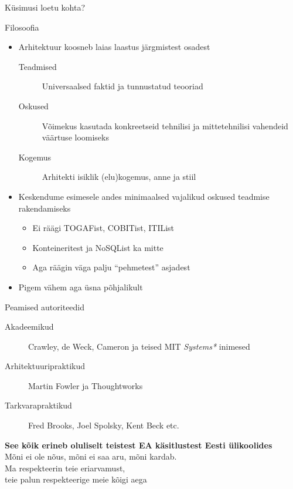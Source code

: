 \documentclass{beamer}
\begin{document}
\begin{frame}[standout]
Küsimusi loetu kohta?
\end{frame}


\begin{frame}{Filosoofia}
	\begin{itemize}
		\item Arhitektuur koosneb laias laastus järgmistest osadest
		\begin{description}
			\item[Teadmised] Universaalsed  faktid ja tunnustatud teooriad
			\item[Oskused] Võimekus kasutada konkreetseid tehnilisi ja mittetehnilisi vahendeid väärtuse loomiseks 
			\item[Kogemus] Arhitekti isiklik (elu)kogemus, anne ja stiil
		\end{description}
		\item Keskendume esimesele andes minimaalsed vajalikud oskused teadmise rakendamiseks
		\begin{itemize}
			\item Ei räägi TOGAFist, COBITist, ITIList
			\item Konteineritest ja NoSQList ka mitte
			\item Aga räägin väga palju \enquote{pehmetest} asjadest
		\end{itemize}
		\item Pigem vähem aga üsna põhjalikult
	\end{itemize}
\end{frame}

\begin{frame}{Peamised autoriteedid}
	\begin{description}
		\item[Akadeemikud] Crawley, de Weck, Cameron ja teised MIT \emph{Systems*} inimesed
		\item[Arhitektuuripraktikud] Martin Fowler ja Thoughtworks
		\item[Tarkvarapraktikud] Fred Brooks, Joel Spolsky, Kent Beck etc.
\end{description}
\end{frame}

\begin{frame}[fragile]
	\begin{center}
		\LARGE{\textbf{See kõik erineb oluliselt teistest EA käsitlustest Eesti ülikoolides}}
		\\[4cm]
		\small{Mõni ei ole nõus, mõni ei saa aru, mõni kardab.\\ Ma respekteerin teie eriarvamust, \\teie palun respekteerige meie kõigi aega}
	\end{center}
\end{frame}
\end{document}
